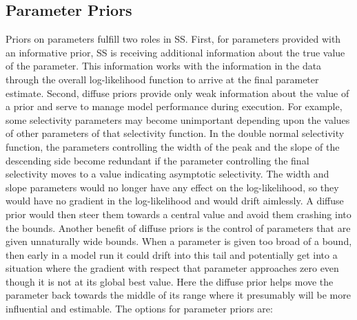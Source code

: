 \subsection{Parameter Priors}
Priors on parameters fulfill two roles in SS.  First, for parameters provided with an informative prior, SS is receiving additional information about the true value of the parameter.  This information works with the information in the data through the overall log-likelihood function to arrive at the final parameter estimate.  Second, diffuse priors provide only weak information about the value of a prior and serve to manage model performance during execution.  For example, some selectivity parameters may become unimportant depending upon the values of other parameters of that selectivity function.  In the double normal selectivity function, the parameters controlling the width of the peak and the slope of the descending side become redundant if the parameter controlling the final selectivity moves to a value indicating asymptotic selectivity.  The width and slope parameters would no longer have any effect on the log-likelihood, so they would have no gradient in the log-likelihood and would drift aimlessly.  A diffuse prior would then steer them towards a central value and avoid them crashing into the bounds.  Another benefit of diffuse priors is the control of parameters that are given unnaturally wide bounds.  When a parameter is given too broad of a bound, then early in a model run it could drift into this tail and potentially get into a situation where the gradient with respect that parameter approaches zero even though it is not at its global best value.  Here the diffuse prior helps move the parameter back towards the middle of its range where it presumably will be more influential and estimable.  The options for parameter priors are:
